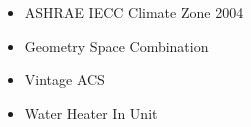 \begin{itemize}
\item ASHRAE IECC Climate Zone 2004
\item Geometry Space Combination
\item Vintage ACS
\item Water Heater In Unit
\end{itemize}
